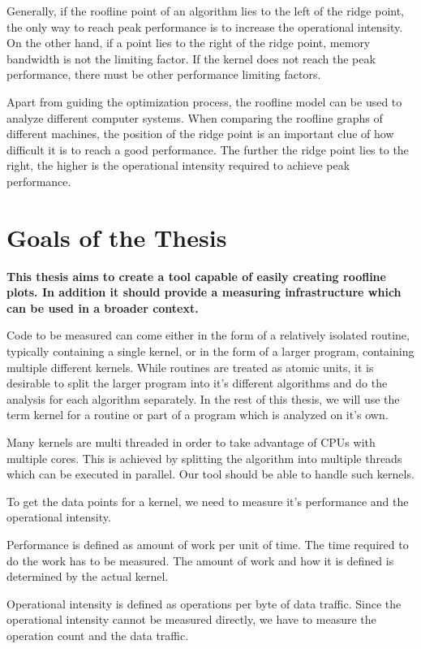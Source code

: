 \documentclass[a4paper,12pt]{report}
\begin{document}
Generally, if the roofline point of an algorithm lies to the left of the
ridge point, the only way to reach peak performance is to increase the
operational intensity. On the other hand, if a point lies to the right of the
ridge point,  memory bandwidth is not the limiting factor. If the kernel does not
reach the peak performance, there must be other performance limiting factors.

Apart from guiding the optimization process, the roofline model can be used to
analyze different computer systems. When comparing the roofline graphs of
different machines, the position of the ridge point is an important clue of how
difficult it is to reach a good performance. The further the ridge point lies to
the right, the higher is the operational intensity required to achieve peak
performance.

\section{Goals of the Thesis}
{\bf This thesis aims to create a tool capable of easily creating roofline
plots. In addition it should provide a measuring infrastructure which can be
used in a broader context.}

Code to be measured can come either in the form of a relatively isolated
routine, typically containing a single kernel, or in the form of a larger
program, containing multiple different kernels. While routines are treated as
atomic units, it is desirable to split the larger program into it's different
algorithms and do the analysis for each algorithm separately. In the rest of
this thesis, we will use the term kernel for a routine or part of a program
which is analyzed on it's own.

Many kernels are multi threaded in order to take advantage of CPUs with multiple
cores. This is achieved by splitting the algorithm into multiple threads which
can be executed in parallel. Our tool should be able to handle such kernels.

To get the data points for a kernel, we need to measure it's performance and
the operational intensity.

Performance is defined as amount of work per unit of time. The time required to
do the work has to be measured. The amount of work and how it is defined is
determined by the actual kernel. 

Operational intensity is defined as operations per byte of data traffic. Since
the operational intensity cannot be measured directly, we have to measure the
operation count and the data traffic.
\end{document}
